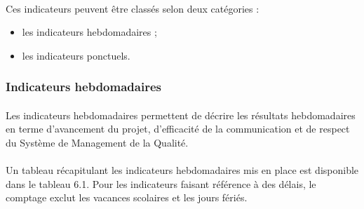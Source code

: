 \paragraph*{} Ces indicateurs peuvent être classés selon deux catégories :
\begin{itemize} 
	\item les indicateurs hebdomadaires ;
	\item les indicateurs ponctuels.
 \end{itemize}

\subsubsection*{Indicateurs hebdomadaires}
\label{Indicateurs hebdomadaires}
\paragraph*{} Les indicateurs hebdomadaires permettent de décrire les résultats hebdomadaires en terme
d'avancement du projet, d'efficacité de la communication et de respect du Système de Management de la Qualité.

\paragraph*{} Un tableau récapitulant les indicateurs hebdomadaires mis en place est disponible dans le
tableau 6.1. Pour les indicateurs faisant référence à des délais, le comptage exclut les vacances
scolaires et les jours fériés.


